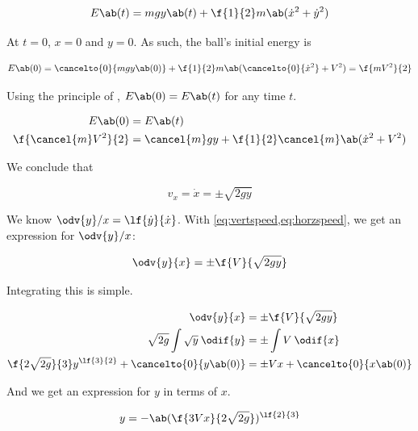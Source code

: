 \begin{equation}
	E\ab(t) = mgy\ab(t) + \f{1}{2}m\ab(\dot{x}^2 + \dot{y}^2)
\end{equation}

At \(t = 0\), \(x = 0\) and \(y = 0\). As such, the ball's initial energy is

\begin{align*}
	E\ab(0) = \cancelto{0}{mgy\ab(0)} +
	\f{1}{2}m\ab(\cancelto{0}{\dot{x}^2} + V^2)
	= \f{mV^2}{2}
\end{align*}

Using the principle of , \(E\ab(0) = E\ab(t)\)
for any time \(t\).

\begin{align*}
	E\ab(0)              & = E\ab(t)                                               \\
	\f{\cancel{m}V^2}{2} & = \cancel{m}gy + \f{1}{2}\cancel{m}\ab(\dot{x}^2 + V^2)
\end{align*}

We conclude that

\begin{equation}
	\label{eq:horzspeed}
	v_x = \dot{x} = \pm\sqrt{2gy}
\end{equation}

We know \(\odv{y}/{x} = \lf{\dot{y}}{\dot{x}}\).
With \cref{eq:vertspeed,eq:horzspeed}, we get an expression for \(\odv{y}/{x}\):

\begin{equation}
	\odv{y}{x} = \pm\f{V}{\sqrt{2gy}}
\end{equation}

Integrating this is simple.

\begin{align*}
	\odv{y}{x}                                             & = \pm\f{V}{\sqrt{2gy}}           \\
	\sqrt{2g}\int\sqrt{y}\:\odif{y}                        & = \pm\int V\:\odif{x}            \\
	\f{2\sqrt{2g}}{3}y^{\lf{3}{2}} + \cancelto{0}{y\ab(0)} & = \pm Vx + \cancelto{0}{x\ab(0)}
\end{align*}

And we get an expression for \(y\) in terms of \(x\).

\begin{equation}
	\label{eq:mysolution}
	y = -\ab(\f{3Vx}{2\sqrt{2g}})^{\lf{2}{3}}
\end{equation}
